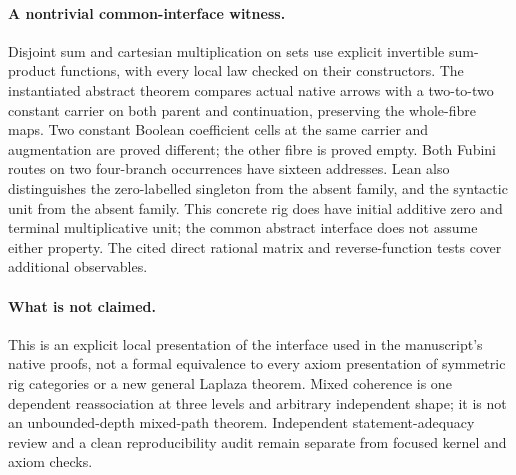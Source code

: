 \documentclass{article}
\begin{document}
\paragraph{A nontrivial common-interface witness.}
Disjoint sum and cartesian multiplication on sets use explicit
invertible sum-product functions, with every local law checked
on their constructors. The instantiated abstract theorem
compares actual native arrows with a two-to-two constant carrier
on both parent and continuation, preserving the whole-fibre
maps. Two constant Boolean coefficient cells at the same
carrier and augmentation are proved different; the other fibre
is proved empty. Both Fubini routes on two four-branch occurrences
have sixteen addresses. Lean also distinguishes the zero-labelled
singleton from the absent family, and the syntactic unit from the
absent family. This concrete rig does have initial additive zero
and terminal multiplicative unit; the common abstract interface
does not assume either property. The cited direct rational
matrix and reverse-function tests cover additional observables.

\paragraph{What is not claimed.}
This is an explicit local presentation of the interface used in
the manuscript's native proofs, not a formal equivalence to every
axiom presentation of symmetric rig categories or a new general
Laplaza theorem. Mixed coherence is one dependent reassociation
at three levels and arbitrary independent shape; it is not an
unbounded-depth mixed-path theorem. Independent statement-adequacy
review and a clean reproducibility audit remain separate from
focused kernel and axiom checks.
\end{document}
